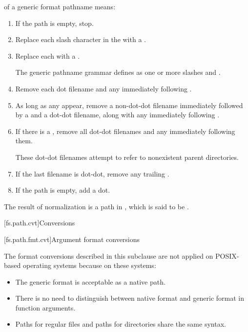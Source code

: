 \pnum
{}%
 of a generic format pathname means:
\begin{enumerate}
\item If the path is empty, stop.
\item Replace each slash character in the  with a .
\item Replace each  with a .
\begin{note}
The generic pathname grammar defines  as one or more slashes and .
\end{note}
\item Remove each dot filename and any immediately following .
\item As long as any appear, remove a non-dot-dot filename immediately followed by a  and a dot-dot filename, along with any immediately following .
\item If there is a , remove all dot-dot filenames and any  immediately following them.
\begin{note}
These dot-dot filenames attempt to refer to nonexistent parent directories.
\end{note}
\item If the last filename is dot-dot, remove any trailing .
\item If the path is empty, add a dot.
\end{enumerate}

The result of normalization is a path in ,
which is said to be .
%

[fs.path.cvt]{Conversions}

[fs.path.fmt.cvt]{Argument format conversions}

\pnum
\begin{note}
The format conversions described in this subclause
are not applied on POSIX-based operating systems
because on these systems:
\begin{itemize}
\item The generic format is acceptable as a native path.
\item There is no need to distinguish between native format and generic format in function arguments.
\item Paths for regular files and paths for directories share the same syntax.
\end{itemize}
\end{note}

